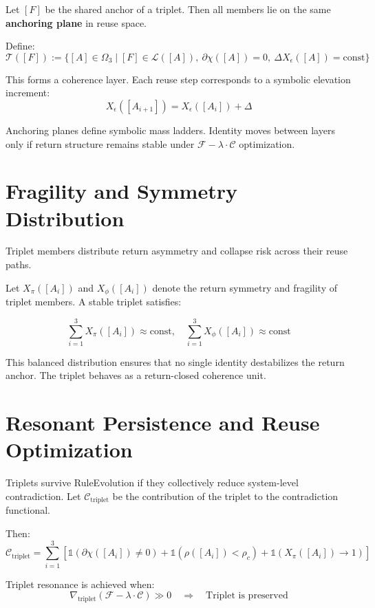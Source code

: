 Let $[F]$ be the shared anchor of a triplet. Then all members lie on the same \textbf{anchoring plane} in reuse space.

Define:
\[
\mathcal{T}([F]) := \{ [A] \in \Omega_3 \mid [F] \in \mathcal{L}([A]),\ \partial\chi([A]) = 0,\ \Delta X_\epsilon([A]) = \text{const} \}
\]

This forms a coherence layer. Each reuse step corresponds to a symbolic elevation increment:
\[
X_\epsilon([A_{i+1}]) = X_\epsilon([A_i]) + \Delta
\]

Anchoring planes define symbolic mass ladders. Identity moves between layers only if return structure remains stable under $\mathcal{F} - \lambda \cdot \mathcal{C}$ optimization.

\section{Fragility and Symmetry Distribution} \label{sec:triplet-fragility}

Triplet members distribute return asymmetry and collapse risk across their reuse paths.

Let $X_\pi([A_i])$ and $X_\phi([A_i])$ denote the return symmetry and fragility of triplet members. A stable triplet satisfies:

\[
\sum_{i=1}^3 X_\pi([A_i]) \approx \text{const}, \quad
\sum_{i=1}^3 X_\phi([A_i]) \approx \text{const}
\]

This balanced distribution ensures that no single identity destabilizes the return anchor. The triplet behaves as a return-closed coherence unit.

\section{Resonant Persistence and Reuse Optimization} \label{sec:triplet-resonance}

Triplets survive RuleEvolution if they collectively reduce system-level contradiction. Let $\mathcal{C}_{\text{triplet}}$ be the contribution of the triplet to the contradiction functional.

Then:
\[
\mathcal{C}_{\text{triplet}} = \sum_{i=1}^3 \left[
\mathbb{1}(\partial\chi([A_i]) \ne 0) +
\mathbb{1}(\rho([A_i]) < \rho_c) +
\mathbb{1}(X_\pi([A_i]) \to 1)
\right]
\]

Triplet resonance is achieved when:
\[
\nabla_{\text{triplet}} (\mathcal{F} - \lambda \cdot \mathcal{C}) \gg 0
\quad \Rightarrow \quad \text{Triplet is preserved}
\]

